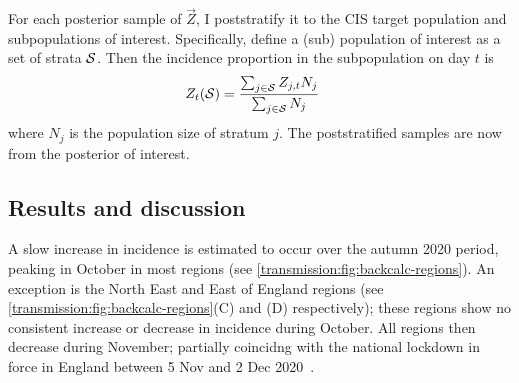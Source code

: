 \documentclass[thesis.tex]{subfiles}
\begin{document}
For each posterior sample of $\vec{Z}$, I poststratify it to the CIS target population and subpopulations of interest.
Specifically, define a (sub) population of interest as a set of strata $\mathcal{S}$.
Then the incidence proportion in the subpopulation on day $t$ is
\begin{align}
Z_t(\mathcal{S})
&= \frac{\sum_{j \in \mathcal{S}} Z_{j,t} N_j}{\sum_{j \in \mathcal{S}} N_j}
\label{backcalc:eq:poststratify}
\end{align}
where $N_j$ is the population size of stratum $j$.
The poststratified samples are now from the posterior of interest.


\subsection{Results and discussion} \label{backcalc:sec:results}

A slow increase in incidence is estimated to occur over the autumn 2020 period, peaking in October in most regions (see \cref{transmission:fig:backcalc-regions}).
An exception is the North East and East of England regions (see \cref{transmission:fig:backcalc-regions}(C) and (D) respectively); these regions show no consistent increase or decrease in incidence during October.
All regions then decrease during November; partially coincidng with the national lockdown in force in England between 5 Nov and 2 Dec 2020~\autocite{ifgTimeline}.
\end{document}
